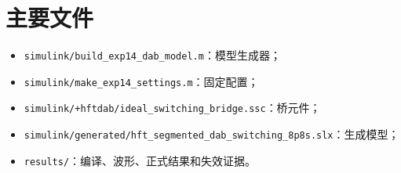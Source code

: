 \documentclass[11pt,a4paper]{ctexart}
\begin{document}
\appendix
\section{主要文件}
\begin{itemize}
\item \texttt{simulink/build\_exp14\_dab\_model.m}：模型生成器；
\item \texttt{simulink/make\_exp14\_settings.m}：固定配置；
\item \texttt{simulink/+hftdab/ideal\_switching\_bridge.ssc}：桥元件；
\item \texttt{simulink/generated/hft\_segmented\_dab\_switching\_8p8s.slx}：生成模型；
\item \texttt{results/}：编译、波形、正式结果和失效证据。
\end{itemize}
\end{document}
